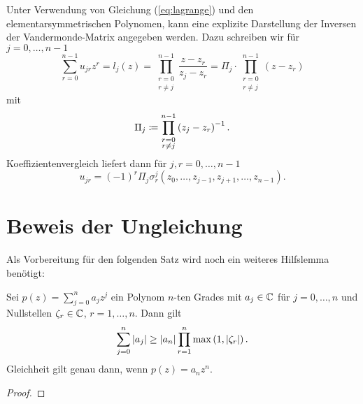 \begin{remark}
    Unter Verwendung von Gleichung (\ref{eq:lagrange}) und den
    elementarsymmetrischen Polynomen, kann eine explizite Darstellung der
    Inversen der Vandermonde-Matrix angegeben werden.
    Dazu schreiben wir für $j = 0, \dots, n-1$
    \begin{equation*}
        \sum_{r = 0}^{n-1} u_{jr} z^{r}
        = l_j(z)
        = \prod_{\substack{r=0\\ r \neq j}}^{n-1} \frac{z - z_r}{z_j - z_r}
        = \Pi_j \cdot \prod_{\substack{r=0\\ r \neq j}}^{n-1} \left( z - z_r \right)
    \end{equation*}
    mit
    \begin{equation}
        \label{def:pi_j}
        \Pi_j \coloneqq \prod_{\substack{r=0\\ r \neq j}}^{n-1} \left( z_j - z_r \right)^{-1}.
    \end{equation}
    Koeffizientenvergleich liefert dann für $j, r = 0, \dots, n-1$
    \begin{equation}
        \label{eq:explicit_inverse_vandermonde}
        u_{jr} = (-1)^{r} \Pi_j \sigma_{r}^{j}(z_0, \dots, z_{j-1}, z_{j+1}, \dots, z_{n-1}).
    \end{equation}
\end{remark}

\section{Beweis der Ungleichung}

Als Vorbereitung für den folgenden Satz wird noch ein weiteres Hilfslemma benötigt:

\begin{lemma}
    \label{lemma:polynom_coefficient_sum_inequality}
    Sei $p(z) = \sum_{j = 0}^{n} a_j z^j$ ein Polynom $n$-ten Grades mit
    $a_j \in \mathbb{C}$ für $j = 0, \dots, n$ und Nullstellen
    $\zeta_r \in \mathbb{C}$, $r = 1, \dots, n$.
    Dann gilt
    \begin{equation}
        \label{eq:polynom_coefficient_sum_inequality}
        \sum_{j=0}^{n} \left\lvert a_j \right\rvert \geq \left\lvert a_n \right\rvert \prod_{r=1}^{n} \max \left(1, \left\lvert \zeta_r \right\rvert \right).
    \end{equation}
    Gleichheit gilt genau dann, wenn $p(z) = a_n z^n$.
\end{lemma}

\begin{proof}
\end{proof}

